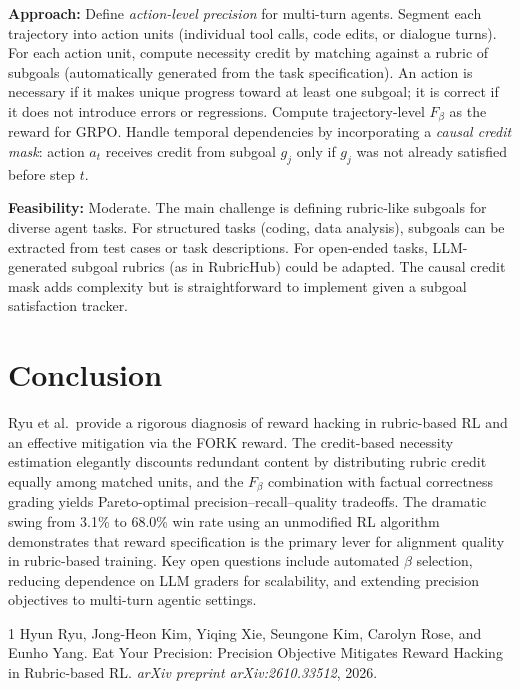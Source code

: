 \documentclass[11pt,a4paper]{article}
\begin{document}
\textbf{Approach:} Define \emph{action-level precision} for multi-turn agents. Segment each trajectory into action units (individual tool calls, code edits, or dialogue turns). For each action unit, compute necessity credit by matching against a rubric of subgoals (automatically generated from the task specification). An action is necessary if it makes unique progress toward at least one subgoal; it is correct if it does not introduce errors or regressions. Compute trajectory-level $F_\beta$ as the reward for GRPO. Handle temporal dependencies by incorporating a \emph{causal credit mask}: action $a_t$ receives credit from subgoal $g_j$ only if $g_j$ was not already satisfied before step $t$.

\textbf{Feasibility:} Moderate. The main challenge is defining rubric-like subgoals for diverse agent tasks. For structured tasks (coding, data analysis), subgoals can be extracted from test cases or task descriptions. For open-ended tasks, LLM-generated subgoal rubrics (as in RubricHub) could be adapted. The causal credit mask adds complexity but is straightforward to implement given a subgoal satisfaction tracker.

\section{Conclusion}
Ryu et al.\ provide a rigorous diagnosis of reward hacking in rubric-based RL and an effective mitigation via the FORK reward. The credit-based necessity estimation elegantly discounts redundant content by distributing rubric credit equally among matched units, and the $F_\beta$ combination with factual correctness grading yields Pareto-optimal precision--recall--quality tradeoffs. The dramatic swing from 3.1\% to 68.0\% win rate using an unmodified RL algorithm demonstrates that reward specification is the primary lever for alignment quality in rubric-based training. Key open questions include automated $\beta$ selection, reducing dependence on LLM graders for scalability, and extending precision objectives to multi-turn agentic settings.


\begin{thebibliography}{1}
Hyun Ryu, Jong-Heon Kim, Yiqing Xie, Seungone Kim, Carolyn Rose, and Eunho Yang.
\newblock Eat Your Precision: Precision Objective Mitigates Reward Hacking in Rubric-based RL.
\newblock \emph{arXiv preprint arXiv:2610.33512}, 2026.
\end{thebibliography}
\end{document}
